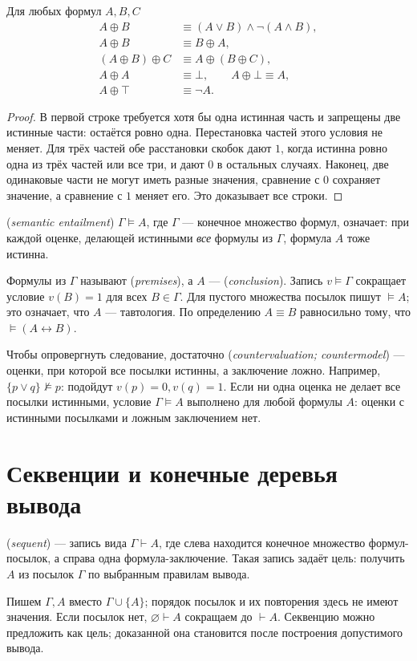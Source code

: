 \begin{theorem}\label{thm:legacy-c16-4}
Для любых формул \(A,B,C\)
\[
\begin{aligned}
A\oplus B&\equiv(A\lor B)\land\neg(A\land B),\\
A\oplus B&\equiv B\oplus A,\\
(A\oplus B)\oplus C&\equiv A\oplus(B\oplus C),\\
A\oplus A&\equiv\bot,\qquad A\oplus\bot\equiv A,\\
A\oplus\top&\equiv\neg A.
\end{aligned}
\]
\end{theorem}
\begin{proof}
В первой строке требуется хотя бы одна истинная часть и запрещены две истинные части: остаётся ровно одна. Перестановка частей этого условия не меняет. Для трёх частей обе расстановки скобок дают \(1\), когда истинна ровно одна из трёх частей или все три, и дают \(0\) в остальных случаях. Наконец, две одинаковые части не могут иметь разные значения, сравнение с \(0\) сохраняет значение, а сравнение с \(1\) меняет его. Это доказывает все строки.
\end{proof}

\begin{definition} (\emph{semantic entailment}) \(\Gamma\models A\), где \(\Gamma\) — конечное множество формул, означает: при каждой оценке, делающей истинными \emph{все} формулы из \(\Gamma\), формула \(A\) тоже истинна.\end{definition}
Формулы из \(\Gamma\) называют  (\emph{premises}), а \(A\) —  (\emph{conclusion}). Запись \(v\models\Gamma\) сокращает условие \(v(B)=1\) для всех \(B\in\Gamma\). Для пустого множества посылок пишут \(\models A\); это означает, что \(A\) — тавтология. По определению \(A\equiv B\) равносильно тому, что \(\models(A\leftrightarrow B)\).

Чтобы опровергнуть следование, достаточно  (\emph{countervaluation; countermodel}) — оценки, при которой все посылки истинны, а заключение ложно. Например, \(\{p\lor q\}\not\models p\): подойдут \(v(p)=0,v(q)=1\). Если ни одна оценка не делает все посылки истинными, условие \(\Gamma\models A\) выполнено для любой формулы \(A\): оценки с истинными посылками и ложным заключением нет.

\section{Секвенции и конечные деревья вывода}
\begin{definition} (\emph{sequent}) — запись вида \(\Gamma\vdash A\), где слева находится конечное множество формул-посылок, а справа одна формула-заключение. Такая запись задаёт цель: получить \(A\) из посылок \(\Gamma\) по выбранным правилам вывода.\end{definition}
Пишем \(\Gamma,A\) вместо \(\Gamma\cup\{A\}\); порядок посылок и их повторения здесь не имеют значения. Если посылок нет, \(\varnothing\vdash A\) сокращаем до \(\vdash A\). Секвенцию можно предложить как цель; доказанной она становится после построения допустимого вывода.

